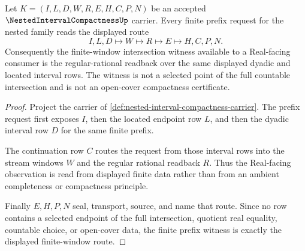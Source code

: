 \begin{theorem}
\label{thm:nested-interval-compactness-finite-intersection-window}
Let $K=(I,L,D,W,R,E,H,C,P,N)$ be an accepted $\NestedIntervalCompactnessUp$ carrier. Every finite prefix request for the nested family reads the displayed route
$$
I,L,D \longmapsto W \longmapsto R \longmapsto E \longmapsto H,C,P,N .
$$
Consequently the finite-window intersection witness available to a Real-facing consumer is the regular-rational readback over the same displayed dyadic and located interval rows. The witness is not a selected point of the full countable intersection and is not an open-cover compactness certificate.
\end{theorem}
\begin{proof}
Project the carrier of \autoref{def:nested-interval-compactness-carrier}. The prefix request first exposes $I$, then the located endpoint row $L$, and then the dyadic interval row $D$ for the same finite prefix.

The continuation row $C$ routes the request from those interval rows into the stream windows $W$ and the regular rational readback $R$. Thus the Real-facing observation is read from displayed finite data rather than from an ambient completeness or compactness principle.

Finally $E,H,P,N$ seal, transport, source, and name that route. Since no row contains a selected endpoint of the full intersection, quotient real equality, countable choice, or open-cover data, the finite prefix witness is exactly the displayed finite-window route.
\end{proof}

